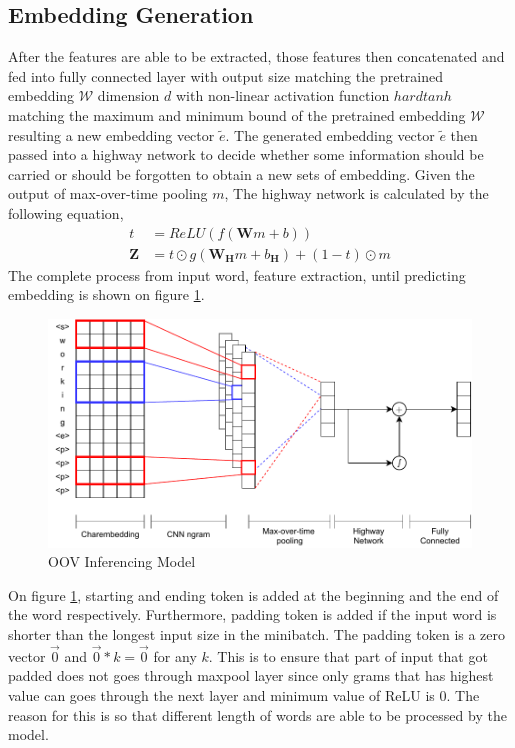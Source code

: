     \subsection{Embedding Generation}
        After the features are able to be extracted, those features
        then concatenated and fed into fully connected layer with
        output size matching the pretrained embedding $\mathcal{W}$
        dimension $d$ with non-linear activation function $hardtanh$
        matching the maximum and minimum bound of the pretrained
        embedding $\mathcal{W}$ resulting a new embedding vector
        $\tilde{e}$. The generated embedding vector $\tilde{e}$ then
        passed into a highway network to decide whether some
        information should be carried or should be forgotten to obtain
        a new sets of embedding. Given the output of max-over-time
        pooling $m$, The highway network is calculated by the
        following equation, 
        \begin{align}
            \label{eq:highway}
            t &= ReLU(f(\mathbf{W}m + b))\\
            \mathbf{Z} &= t \odot g(\mathbf{W_{\mathbf{H}}}m + b_{\mathbf{H}}) + (1-t) \odot m
        \end{align}
        The complete process from input word, feature extraction,
        until predicting embedding is shown on figure \ref{fig:model}.
        
        \begin{figure}
            \centering
            \includegraphics[width=.8\linewidth]{images/model2.pdf}
            \caption{OOV Inferencing Model}
            \label{fig:model}
        \end{figure}

        On figure \ref{fig:model}, starting and ending token is added
        at the beginning and the end of the word respectively.
        Furthermore, padding token is added if the input word is
        shorter than the longest input size in the minibatch. The
        padding token is a zero vector $\vec{0}$ and $\vec{0} * k =
        \vec{0}$ for any $k$. This is to ensure that part of input
        that got padded does not goes through maxpool layer since only
        grams that has highest value can goes through the next layer
        and minimum value of ReLU is 0. The reason for this is so that
        different length of words are able to be processed by the model.

